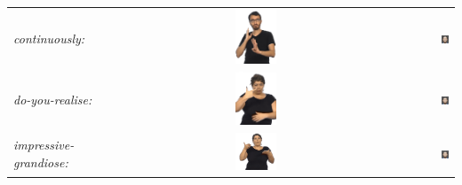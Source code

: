 \documentclass[../../main]{subfiles}
\begin{document}
\begin{longtable}{|l|c|r|}
    \emph{continuously:} & \includegraphics[width=0.15\textwidth]{chapters/facial_expressions/images/original_facial_expressions/continuously.png} & \includegraphics[width=0.15\textwidth]{chapters/facial_expressions/images/synthesized_expressions/continuously.png} \\
    \emph{do-you-realise:} & \includegraphics[width=0.15\textwidth]{chapters/facial_expressions/images/original_facial_expressions/do_you_realise.png} & \includegraphics[width=0.15\textwidth]{chapters/facial_expressions/images/synthesized_expressions/do_you_realise.png} \\
    \emph{impressive-grandiose:} & \includegraphics[width=0.15\textwidth]{chapters/facial_expressions/images/original_facial_expressions/impressive_grandiose.png} & \includegraphics[width=0.15\textwidth]{chapters/facial_expressions/images/synthesized_expressions/impressive_grandiose.png} \\

\end{longtable}
\end{document}
